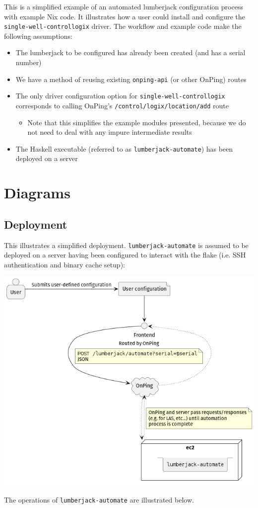 \documentclass[11pt]{article}
\author{Rory Tyler Hayford}
\date{\today}
\title{}
\begin{document}
\setcounter{tocdepth}{3}
\tableofcontents

This is a simplified example of an automated lumberjack configuration process with example Nix code. It illustrates how a user could install and configure the \texttt{single-well-controllogix} driver. The workflow and example code make the following assumptions:
\begin{itemize}
\item The lumberjack to be configured has already been created (and has a serial number)
\item We have a method of reusing existing \texttt{onping-api} (or other OnPing) routes
\item The only driver configuration option for \texttt{single-well-controllogix} corresponds to calling OnPing's \texttt{/control/logix/location/add} route
\begin{itemize}
\item Note that this simplifies the example modules presented, because we do not need to deal with any impure intermediate results
\end{itemize}
\item The Haskell executable (referred to as \texttt{lumberjack-automate}) has been deployed on a server
\end{itemize}

\section*{Diagrams}
\label{sec:orgd2f4682}
\subsection*{Deployment}
\label{sec:org9681d48}
This illustrates a simplified deployment. \texttt{lumberjack-automate} is assumed to be deployed on a server having been configured to interact with the flake (i.e. SSH authentication and binary cache setup):
\begin{center}
\includegraphics[width=.9\linewidth]{./deploy.png}
\end{center}
The operations of \texttt{lumberjack-automate} are illustrated below.
\end{document}
